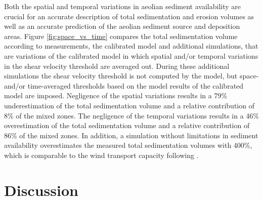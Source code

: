 Both the spatial and temporal variations in aeolian sediment
availability are crucial for an accurate description of total
sedimentation and erosion volumes as well as an accurate prediction of
the aeolian sediment source and deposition areas. Figure
\ref{fig:space_vs_time} compares the total sedimentation volume
according to measurements, the calibrated model and additional
simulations, that are variations of the calibrated model in which
spatial and/or temporal variations in the shear velocity threshold are
averaged out. During these additional simulations the shear velocity
threshold is not computed by the model, but space- and/or
time-averaged thresholds based on the model results of the calibrated
model are imposed. Negligence of the spatial variations results in a
79\% underestimation of the total sedimentation volume and a relative
contribution of 8\% of the mixed zones. The negligence of the temporal
variations results in a 46\% overestimation of the total sedimentation
volume and a relative contribution of 86\% of the mixed zones.  In
addition, a simulation without limitations in sediment availability
overestimates the measured total sedimentation volumes with 400\%,
which is comparable to the wind transport capacity following
\citet[][Figure \ref{fig:models}]{Bagnold1937a}.






%

\section{Discussion}

